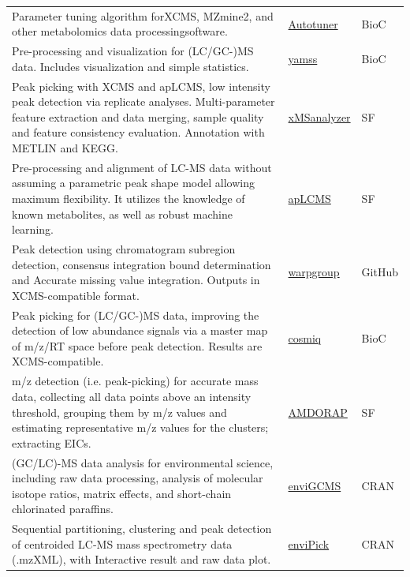 \documentclass[]{article}
\begin{document}
\begin{longtable}{>{\raggedright\arraybackslash}p{30em}>{\raggedright\arraybackslash}p{10em}>{\raggedright\arraybackslash}p{3em}}
\rowcolor{gray!6}  Parameter tuning algorithm forXCMS, MZmine2, and other metabolomics data processingsoftware. & \href{https://doi.org/doi:10.18129/B9.bioc.Autotuner}{Autotuner} & BioC\\
Pre-processing and visualization for (LC/GC-)MS data. Includes visualization and simple statistics. & \href{http://bioconductor.org/packages/release/bioc/html/yamss.html}{yamss} & BioC\\
\rowcolor{gray!6}  Peak picking with XCMS and apLCMS, low intensity peak detection via replicate analyses. Multi-parameter feature extraction and data merging, sample quality and feature consistency evaluation. Annotation with METLIN and KEGG. & \href{https://sourceforge.net/projects/xmsanalyzer/}{xMSanalyzer} & SF\\
Pre-processing and alignment of LC-MS data without assuming a parametric peak shape model allowing maximum flexibility. It utilizes the knowledge of known metabolites, as well as robust machine learning. & \href{http://web1.sph.emory.edu/apLCMS/}{apLCMS} & SF\\
\rowcolor{gray!6}  Peak detection using chromatogram subregion detection, consensus integration bound determination and Accurate missing value integration. Outputs in XCMS-compatible format. & \href{https://github.com/nathaniel-mahieu/warpgroup}{warpgroup} & GitHub\\
Peak picking for (LC/GC-)MS data, improving the detection of low abundance signals via a master map of m/z/RT space before peak detection. Results are XCMS-compatible. & \href{https://doi.org/doi:10.18129/B9.bioc.cosmiq}{cosmiq} & BioC\\
\rowcolor{gray!6}  m/z detection (i.e. peak-picking) for accurate mass data, collecting all data points above an intensity threshold, grouping them by m/z values and estimating representative m/z values for the clusters; extracting EICs. & \href{http://amdorap.sourceforge.net/}{AMDORAP} & SF\\
(GC/LC)-MS data analysis for environmental science, including raw data processing, analysis of molecular isotope ratios, matrix effects, and short-chain chlorinated paraffins. & \href{https://cran.r-project.org/web/packages/enviGCMS/index.html}{enviGCMS} & CRAN\\
\rowcolor{gray!6}  Sequential partitioning, clustering and peak detection of centroided LC-MS mass spectrometry data (.mzXML), with Interactive result and raw data plot. & \href{https://cran.r-project.org/web/packages/enviPick/index.html}{enviPick} & CRAN\\

\end{longtable}
\end{document}
